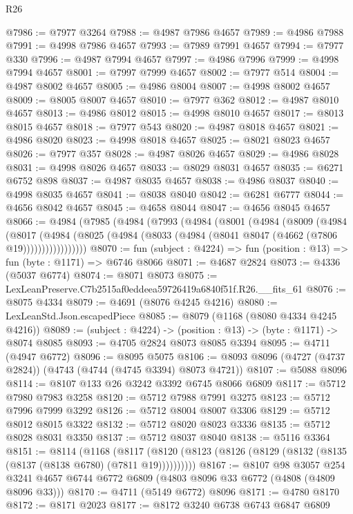 \begin{lexlean}{R26}
\begin{coremodule}
@7986 := @7977 @3264
@7988 := @4987 @7986 @4657
@7989 := @4986 @7988
@7991 := @4998 @7986 @4657
@7993 := @7989 @7991 @4657
@7994 := @7977 @330
@7996 := @4987 @7994 @4657
@7997 := @4986 @7996
@7999 := @4998 @7994 @4657
@8001 := @7997 @7999 @4657
@8002 := @7977 @514
@8004 := @4987 @8002 @4657
@8005 := @4986 @8004
@8007 := @4998 @8002 @4657
@8009 := @8005 @8007 @4657
@8010 := @7977 @362
@8012 := @4987 @8010 @4657
@8013 := @4986 @8012
@8015 := @4998 @8010 @4657
@8017 := @8013 @8015 @4657
@8018 := @7977 @543
@8020 := @4987 @8018 @4657
@8021 := @4986 @8020
@8023 := @4998 @8018 @4657
@8025 := @8021 @8023 @4657
@8026 := @7977 @357
@8028 := @4987 @8026 @4657
@8029 := @4986 @8028
@8031 := @4998 @8026 @4657
@8033 := @8029 @8031 @4657
@8035 := @6271 @6752 @898
@8037 := @4987 @8035 @4657
@8038 := @4986 @8037
@8040 := @4998 @8035 @4657
@8041 := @8038 @8040
@8042 := @6281 @6777
@8044 := @4656 @8042 @4657
@8045 := @4658 @8044
@8047 := @4656 @8045 @4657
@8066 := @4984
    (@7985
      (@4984
        (@7993
          (@4984
            (@8001
              (@4984
                (@8009
                  (@4984
                    (@8017
                      (@4984
                        (@8025 (@4984 (@8033 (@4984 (@8041 @8047 (@4662 (@7806 @19)))))))))))))))))
@8070 := fun (subject : @4224) => fun (position : @13) => fun (byte : @1171) => @6746 @8066
@8071 := @4687 @2824
@8073 := @4336 (@5037 @6774)
@8074 := @8071 @8073
@8075 := LexLeanPreserve.C7b2515af0eddeea59726419a6840f51f.R26.__fits_61
@8076 := @8075 @4334
@8079 := @4691 (@8076 @4245 @4216)
@8080 := LexLeanStd.Json.escapedPiece
@8085 := @8079 (@1168 (@8080 @4334 @4245 @4216))
@8089 := (subject : @4224) -> (position : @13) -> (byte : @1171) -> @8074 @8085
@8093 := @4705 @2824 @8073 @8085 @3394
@8095 := @4711 (@4947 @6772)
@8096 := @8095 @5075
@8106 := @8093 @8096 (@4727 (@4737 @2824)) (@4743 (@4744 (@4745 @3394) @8073 @4721))
@8107 := @5088 @8096
@8114 := @8107 @133 @26 @3242 @3392 @6745 @8066 @6809
@8117 := @5712 @7980 @7983 @3258
@8120 := @5712 @7988 @7991 @3275
@8123 := @5712 @7996 @7999 @3292
@8126 := @5712 @8004 @8007 @3306
@8129 := @5712 @8012 @8015 @3322
@8132 := @5712 @8020 @8023 @3336
@8135 := @5712 @8028 @8031 @3350
@8137 := @5712 @8037 @8040
@8138 := @5116 @3364
@8151 := @8114
    (@1168
      (@8117 (@8120 (@8123 (@8126 (@8129 (@8132 (@8135 (@8137 (@8138 @6780) (@7811 @19))))))))))
@8167 := @8107
    @98
    @3057
    @254
    @3241
    @4657
    @6744
    @6772
    @6809
    (@4803 @8096 @33 @6772 (@4808 (@4809 @8096 @33)))
@8170 := @4711 (@5149 @6772) @8096
@8171 := @4780 @8170
@8172 := @8171 @2023
@8177 := @8172 @3240 @6738 @6743 @6847 @6809

\end{coremodule}
\end{lexlean}
